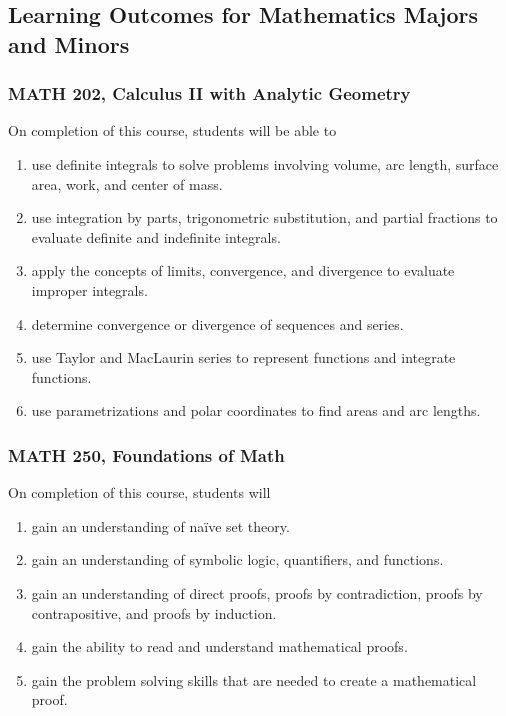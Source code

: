 \documentclass[11pt]{article}
\newenvironment{alphalist}{
\begin{enumerate}[label=(\arabic*),widest=107 ,leftmargin=25pt, itemsep=0pt]}
{\end{enumerate}}
\begin{document}
\subsection{Learning Outcomes for Mathematics Majors and Minors}

\subsubsection{MATH 202, Calculus II with Analytic Geometry}

 On completion of this course, students will be able to
 \begin{alphalist}
    \item use definite integrals to solve problems involving volume, arc length, 
       surface area, work, and center of mass. 
    \item use integration by parts, trigonometric substitution, and partial fractions 
        to evaluate definite and indefinite integrals.
    \item apply the concepts of limits, convergence, and divergence to evaluate 
        improper integrals.
    \item determine convergence or divergence of sequences and series.
    \item use Taylor and MacLaurin series to represent functions and integrate 
        functions.
    \item use parametrizations and polar coordinates to find areas and arc lengths.
 \end{alphalist}

\subsubsection{MATH 250, Foundations of Math}

On completion of this course, students will
\begin{alphalist}
    \item gain an understanding of na\"ive set theory. 
    \item gain an understanding of symbolic logic, quantifiers, and functions.
    \item gain an understanding of direct proofs, proofs by contradiction, proofs by contrapositive, and proofs by induction.
    \item gain the ability to read and understand mathematical proofs.
    \item gain the problem solving skills that are needed to create a mathematical proof.
\end{alphalist}
\end{document}
